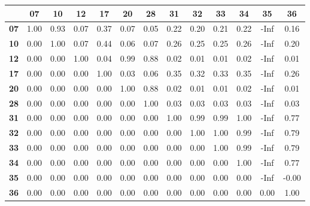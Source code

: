 \begin{tiny}\begin{tabular}{|l|c|c|c|c|c|c|c|c|c|c|c|c|}
\hline
&\textbf{07}&\textbf{10}&\textbf{12}&\textbf{17}&\textbf{20}&\textbf{28}&\textbf{31}&\textbf{32}&\textbf{33}&\textbf{34}&\textbf{35}&\textbf{36}\\\hline
\textbf{07}&1.00&0.93&0.07&0.37&0.07&0.05&0.22&0.20&0.21&0.22&-Inf&0.16\\\hline
\textbf{10}&0.00&1.00&0.07&0.44&0.06&0.07&0.26&0.25&0.25&0.26&-Inf&0.20\\\hline
\textbf{12}&0.00&0.00&1.00&0.04&0.99&0.88&0.02&0.01&0.01&0.02&-Inf&0.01\\\hline
\textbf{17}&0.00&0.00&0.00&1.00&0.03&0.06&0.35&0.32&0.33&0.35&-Inf&0.26\\\hline
\textbf{20}&0.00&0.00&0.00&0.00&1.00&0.88&0.02&0.01&0.01&0.02&-Inf&0.01\\\hline
\textbf{28}&0.00&0.00&0.00&0.00&0.00&1.00&0.03&0.03&0.03&0.03&-Inf&0.03\\\hline
\textbf{31}&0.00&0.00&0.00&0.00&0.00&0.00&1.00&0.99&0.99&1.00&-Inf&0.77\\\hline
\textbf{32}&0.00&0.00&0.00&0.00&0.00&0.00&0.00&1.00&1.00&0.99&-Inf&0.79\\\hline
\textbf{33}&0.00&0.00&0.00&0.00&0.00&0.00&0.00&0.00&1.00&0.99&-Inf&0.79\\\hline
\textbf{34}&0.00&0.00&0.00&0.00&0.00&0.00&0.00&0.00&0.00&1.00&-Inf&0.77\\\hline
\textbf{35}&0.00&0.00&0.00&0.00&0.00&0.00&0.00&0.00&0.00&0.00&-Inf&-0.00\\\hline
\textbf{36}&0.00&0.00&0.00&0.00&0.00&0.00&0.00&0.00&0.00&0.00&0.00&1.00\\\hline
\end{tabular}
\end{tiny}